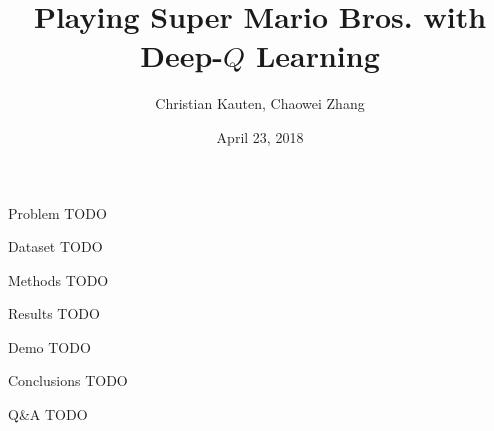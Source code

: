 \documentclass{beamer}
\title{Playing Super Mario Bros. with Deep-$Q$ Learning}
\author{Christian Kauten, Chaowei Zhang}
\institute{Auburn University}
\date{April 23, 2018}
\begin{document}
\frame{\titlepage}

\begin{frame}{Problem}
TODO
\end{frame}

\begin{frame}{Dataset}
TODO
\end{frame}

\begin{frame}{Methods}
TODO
\end{frame}

\begin{frame}{Results}
TODO
\end{frame}

\begin{frame}{Demo}
TODO
\end{frame}

\begin{frame}{Conclusions}
TODO
\end{frame}

\begin{frame}{Q\&A}
TODO
\end{frame}
\end{document}
